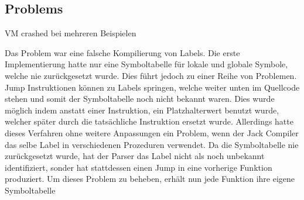 \subsection{Problems}
VM crashed bei mehreren Beispielen

Das Problem war eine falsche Kompilierung von Labels. Die erste Implementierung hatte nur eine Symboltabelle für lokale und globale Symbole, welche nie zurückgesetzt wurde. Dies führt jedoch zu einer Reihe von Problemen.
Jump Instruktionen können zu Labels springen, welche weiter unten im Quellcode stehen und somit der Symboltabelle noch nicht bekannt waren. Dies wurde möglich indem anstatt einer Instruktion, ein Platzhalterwert benutzt wurde, welcher später durch die tatsächliche Instruktion ersetzt wurde.
Allerdings hatte dieses Verfahren ohne weitere Anpassungen ein Problem, wenn der Jack Compiler das selbe Label in verschiedenen Prozeduren verwendet. Da die Symboltabelle nie zurückgesetzt wurde, hat der Parser das Label nicht als noch unbekannt identifiziert, sonder hat stattdessen einen Jump in eine vorherige Funktion produziert.
Um dieses Problem zu beheben, erhält nun jede Funktion ihre eigene Symboltabelle

